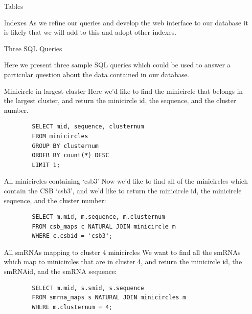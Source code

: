 \documentclass[a4paper,10pt,notitlepage]{article}
\begin{document}
\begin{section}{Tables}
\begin{subsection}{Indexes}
        As we refine our queries and develop the web interface to our database it is likely that we will add to this and adopt
        other indexes.

    \end{subsection}



\end{section}

\begin{section}{Three SQL Queries}

    Here we present three sample SQL queries which could be used to answer a particular question about the data contained in our
    database.

    \begin{subsection}{Minicircle in largest cluster}
        Here we'd like to find the minicircle that belongs in the largest cluster, and return the minicircle id, the sequence,
        and the cluster number.

        \begin{lstlisting}
        SELECT mid, sequence, clusternum
        FROM minicircles
        GROUP BY clusternum
        ORDER BY count(*) DESC
        LIMIT 1;
        \end{lstlisting}
    \end{subsection}

    \begin{subsection}{All minicircles containing `csb3'}
        Now we'd like to find all of the minicircles which contain the CSB `csb3', and we'd like to return the minicircle id, the 
        minicircle sequence, and the cluster number:

        \begin{lstlisting}
        SELECT m.mid, m.sequence, m.clusternum
        FROM csb_maps c NATURAL JOIN minicircle m
        WHERE c.csbid = 'csb3';
        \end{lstlisting}
    \end{subsection}

    \begin{subsection}{All smRNAs mapping to cluster 4 minicircles}
        We want to find all the smRNAs which map to minicircles that are in cluster 4, and return the minicircle id, the smRNAid, 
        and the smRNA sequence:

        \begin{lstlisting}
        SELECT m.mid, s.smid, s.sequence
        FROM smrna_maps s NATURAL JOIN minicircles m
        WHERE m.clusternum = 4;
        \end{lstlisting}

    \end{subsection}
\end{section}
\end{document}
